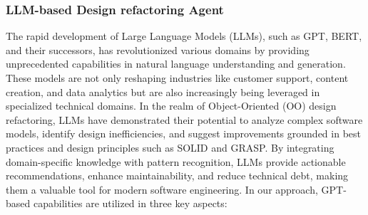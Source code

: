 \documentclass[pdflatex,sn-mathphys-num]{sn-jnl}%
\theoremstyle{thmstyleone}%
\theoremstyle{thmstyletwo}%
\theoremstyle{thmstylethree}%
\begin{document}
\subsubsection{LLM-based Design refactoring Agent}
The rapid development of Large Language Models (LLMs), such as GPT, BERT, and their successors, has revolutionized various domains by providing unprecedented capabilities in natural language understanding and generation. These models are not only reshaping industries like customer support, content creation, and data analytics but are also increasingly being leveraged in specialized technical domains. In the realm of Object-Oriented (OO) design refactoring, LLMs have demonstrated their potential to analyze complex software models, identify design inefficiencies, and suggest improvements grounded in best practices and design principles such as SOLID and GRASP. By integrating domain-specific knowledge with pattern recognition, LLMs provide actionable recommendations, enhance maintainability, and reduce technical debt, making them a valuable tool for modern software engineering.
In our approach, GPT-based capabilities are utilized in three key aspects:
\end{document}
